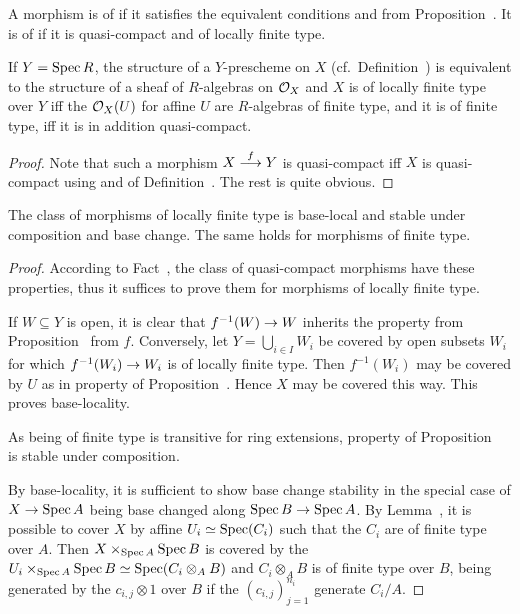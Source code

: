 \documentclass[a4paper,parskip=half,numbers=enddot, DIV=12]{scrreprt}
\begin{document}
\begin{defi}
    A morphism is of  if it satisfies the equivalent conditions  and  from Proposition~. It is of  if it is quasi-compact and of locally finite type.
\end{defi}

\begin{fact}
    If $Y=\operatorname{Spec} R$, the structure of a $Y$-prescheme on $X$ (cf.\ Definition~) is equivalent to the structure of a sheaf of $R$-algebras on $\mathcal{O}_X$ and $X$ is of locally finite type over $Y$ iff the $\mathcal{O}_X(U)$ for affine $U$ are $R$-algebras of finite type, and it is of finite type, iff it is in addition quasi-compact.
\end{fact}
\begin{proof}
	Note that such a  morphism $X\morphism[f]Y$ is quasi-compact iff $X$ is quasi-compact using \itememph{\alpha} and \itememph{\gamma} of Definition~. The rest is quite obvious.
\end{proof}
\begin{fact}
    The class of morphisms of locally finite type is base-local and stable under composition and base change. The same holds for morphisms of finite type. 
\end{fact}
\begin{proof}
    According to Fact~, the class of quasi-compact morphisms have these properties, thus it suffices to prove them for morphisms of locally finite type. 
    
    If $W\subseteq Y$ is open, it is clear that $f^{-1}(W)\morphism W$ inherits the property  from Proposition~ from $f$. Conversely, let $Y=\bigcup_{i\in I}W_i$ be covered by open subsets $W_i$ for which $f^{-1}(W_i)\morphism W_i$ is of locally finite type. Then $f^{-1}(W_i)$ may be covered by $U$ as in property  of Proposition~. Hence $X$ may be covered this way. This proves base-locality.
    
    As being of finite type is transitive for ring extensions, property  of Proposition~ is stable under composition.
    
    By base-locality, it is sufficient to show base change stability in the special case of $X\morphism \Spec A$ being base changed along $\Spec B\morphism \Spec A$. By Lemma~, it is possible to cover $X$ by affine $U_i\simeq \operatorname{Spec}(C_i)$ such that the $C_i$ are of finite type over $A$. Then $X\times_{\operatorname{Spec} A} \operatorname{Spec} B$ is covered by the $U_i\times_{\operatorname{Spec} A} \operatorname{Spec} B \simeq \operatorname{Spec}(C_i\otimes_A B)$ and $C_i\otimes_A B$ is of finite type over $B$, being generated by the $c_{i,j}\otimes 1$ over $B$ if the $(c_{i,j})_{j=1}^{n_i}$ generate $C_i/A$.
\end{proof}
\end{document}
